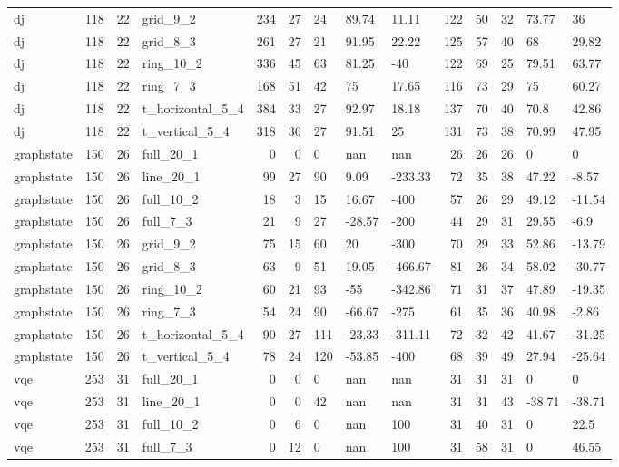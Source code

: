 \begin{longtable}{lrrlrrlllrrlll}
dj & 118 & 22 & grid\_9\_2 & 234 & 27 & 24 & 89.74 & 11.11 & 122 & 50 & 32 & 73.77 & 36 \\
dj & 118 & 22 & grid\_8\_3 & 261 & 27 & 21 & 91.95 & 22.22 & 125 & 57 & 40 & 68 & 29.82 \\
dj & 118 & 22 & ring\_10\_2 & 336 & 45 & 63 & 81.25 & -40 & 122 & 69 & 25 & 79.51 & 63.77 \\
dj & 118 & 22 & ring\_7\_3 & 168 & 51 & 42 & 75 & 17.65 & 116 & 73 & 29 & 75 & 60.27 \\
dj & 118 & 22 & t\_horizontal\_5\_4 & 384 & 33 & 27 & 92.97 & 18.18 & 137 & 70 & 40 & 70.8 & 42.86 \\
dj & 118 & 22 & t\_vertical\_5\_4 & 318 & 36 & 27 & 91.51 & 25 & 131 & 73 & 38 & 70.99 & 47.95 \\
graphstate & 150 & 26 & full\_20\_1 & 0 & 0 & 0 & nan & nan & 26 & 26 & 26 & 0 & 0 \\
graphstate & 150 & 26 & line\_20\_1 & 99 & 27 & 90 & 9.09 & -233.33 & 72 & 35 & 38 & 47.22 & -8.57 \\
graphstate & 150 & 26 & full\_10\_2 & 18 & 3 & 15 & 16.67 & -400 & 57 & 26 & 29 & 49.12 & -11.54 \\
graphstate & 150 & 26 & full\_7\_3 & 21 & 9 & 27 & -28.57 & -200 & 44 & 29 & 31 & 29.55 & -6.9 \\
graphstate & 150 & 26 & grid\_9\_2 & 75 & 15 & 60 & 20 & -300 & 70 & 29 & 33 & 52.86 & -13.79 \\
graphstate & 150 & 26 & grid\_8\_3 & 63 & 9 & 51 & 19.05 & -466.67 & 81 & 26 & 34 & 58.02 & -30.77 \\
graphstate & 150 & 26 & ring\_10\_2 & 60 & 21 & 93 & -55 & -342.86 & 71 & 31 & 37 & 47.89 & -19.35 \\
graphstate & 150 & 26 & ring\_7\_3 & 54 & 24 & 90 & -66.67 & -275 & 61 & 35 & 36 & 40.98 & -2.86 \\
graphstate & 150 & 26 & t\_horizontal\_5\_4 & 90 & 27 & 111 & -23.33 & -311.11 & 72 & 32 & 42 & 41.67 & -31.25 \\
graphstate & 150 & 26 & t\_vertical\_5\_4 & 78 & 24 & 120 & -53.85 & -400 & 68 & 39 & 49 & 27.94 & -25.64 \\
vqe & 253 & 31 & full\_20\_1 & 0 & 0 & 0 & nan & nan & 31 & 31 & 31 & 0 & 0 \\
vqe & 253 & 31 & line\_20\_1 & 0 & 0 & 42 & nan & nan & 31 & 31 & 43 & -38.71 & -38.71 \\
vqe & 253 & 31 & full\_10\_2 & 0 & 6 & 0 & nan & 100 & 31 & 40 & 31 & 0 & 22.5 \\
vqe & 253 & 31 & full\_7\_3 & 0 & 12 & 0 & nan & 100 & 31 & 58 & 31 & 0 & 46.55 \\

\end{longtable}
